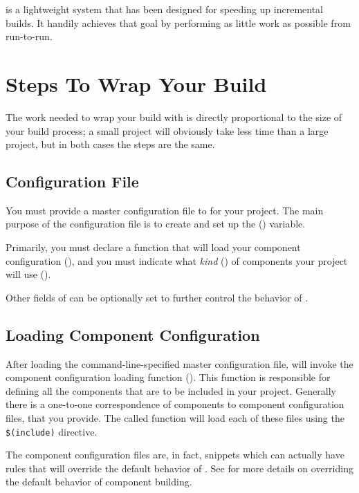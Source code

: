\lmsbw is a lightweight system that has been designed for speeding up
incremental builds.  It handily achieves that goal by performing as
little work as possible from run-to-run.

\section{Steps To Wrap Your Build}

The work needed to wrap your build with \lmsbw is directly
proportional to the size of your build process; a small project will
obviously take less time than a large project, but in both cases the
steps are the same.

\subsection{Configuration File}

You must provide a master configuration file to \lmsbw for your
project.  The main purpose of the configuration file is to create and
set up the \lmsbwconfiguration ()
variable.

Primarily, you must declare a \gnumake function that will load your
component configuration
(), and you must indicate
what \emph{kind} () of components your project
will use ().

Other fields of \lmsbwconfiguration can be optionally set to further
control the behavior of \lmsbw.

\subsection{Loading Component Configuration}

After loading the command-line-specified master configuration file,
\lmsbw will invoke the component configuration loading function
().  This function is responsible
for defining all the components that are to be included in your
project.  Generally there is a one-to-one correspondence of components
to component configuration files, that you provide.  The called
function will load each of these files using the \gnumake
\texttt{\$(include)} directive.

The component configuration files are, in fact, \makefile snippets
which can actually have rules that will override the default behavior
of \lmsbw.  See  for more details on overriding
the default behavior of component building.


